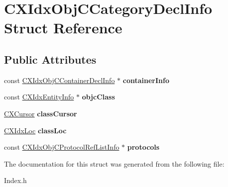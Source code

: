 \hypertarget{structCXIdxObjCCategoryDeclInfo}{}\section{C\+X\+Idx\+Obj\+C\+Category\+Decl\+Info Struct Reference}
\label{structCXIdxObjCCategoryDeclInfo}
\subsection*{Public Attributes}
\begin{DoxyCompactItemize}
\item 
\mbox{\label{structCXIdxObjCCategoryDeclInfo_ada62478182e0d4c1d6532acc30626441}} 
const \mbox{\hyperlink{structCXIdxObjCContainerDeclInfo}{C\+X\+Idx\+Obj\+C\+Container\+Decl\+Info}} $\ast$ {\bfseries container\+Info}
\item 
\mbox{\label{structCXIdxObjCCategoryDeclInfo_a4a005c49962d2d79f43948a3c99574cb}} 
const \mbox{\hyperlink{structCXIdxEntityInfo}{C\+X\+Idx\+Entity\+Info}} $\ast$ {\bfseries objc\+Class}
\item 
\mbox{\label{structCXIdxObjCCategoryDeclInfo_a33abfefb90d13fe4db7f65493139d56c}} 
\mbox{\hyperlink{structCXCursor}{C\+X\+Cursor}} {\bfseries class\+Cursor}
\item 
\mbox{\label{structCXIdxObjCCategoryDeclInfo_a15f100b066927d642068d564adbf9c45}} 
\mbox{\hyperlink{structCXIdxLoc}{C\+X\+Idx\+Loc}} {\bfseries class\+Loc}
\item 
\mbox{\label{structCXIdxObjCCategoryDeclInfo_a756b51f99ced89cf5f3c4b7bf6196b2d}} 
const \mbox{\hyperlink{structCXIdxObjCProtocolRefListInfo}{C\+X\+Idx\+Obj\+C\+Protocol\+Ref\+List\+Info}} $\ast$ {\bfseries protocols}
\end{DoxyCompactItemize}


The documentation for this struct was generated from the following file\+:\begin{DoxyCompactItemize}
\item 
Index.\+h\end{DoxyCompactItemize}
